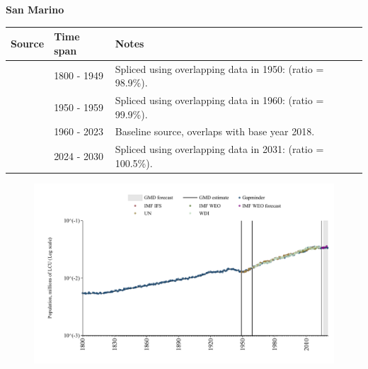 \documentclass[12pt,a4paper,landscape]{article}
\begin{document}
\begin{adjustbox}{max totalsize={\paperwidth}{\paperheight},center}
\begin{minipage}[t][\textheight][t]{\textwidth}
\vspace*{0.5cm}
{}
\begin{center}
{\Large\bfseries San Marino}
\end{center}
\vspace{0.5cm}
\begin{table}[H]
\centering
\small
\begin{tabular}{|l|l|l|}
\hline
\textbf{Source} & \textbf{Time span} & \textbf{Notes} \\
\hline
\rowcolor{white}\cite{Gapminder}& 1800 - 1949 &Spliced using overlapping data in 1950: (ratio = 98.9\%).\\
\rowcolor{lightgray}\cite{IMF_IFS}& 1950 - 1959 &Spliced using overlapping data in 1960: (ratio = 99.9\%).\\
\rowcolor{white}\cite{WDI}& 1960 - 2023 &Baseline source, overlaps with base year 2018.\\
\rowcolor{lightgray}\cite{Gapminder}& 2024 - 2030 &Spliced using overlapping data in 2031: (ratio = 100.5\%).\\
\hline
\end{tabular}
\end{table}
\begin{figure}[H]
\centering
\includegraphics[width=\textwidth,height=0.6\textheight,keepaspectratio]{graphs/SMR_pop.pdf}
\end{figure}
\end{minipage}
\end{adjustbox}
\end{document}
